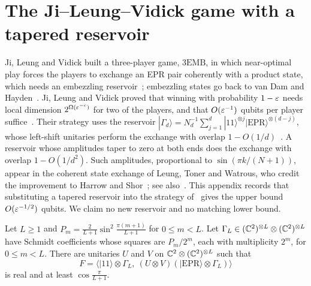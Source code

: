 \section{The Ji--Leung--Vidick game with a tapered reservoir}\label{app:reservoir}

Ji, Leung and Vidick built a three-player game, $\mathrm{3EMB}$, in which near-optimal play forces the players to exchange
an EPR pair coherently with a product state, which needs an embezzling reservoir~\cite{JLV20}; embezzling states go back to van Dam
and Hayden~\cite{vDH03}. Ji, Leung and Vidick proved that winning
with probability $1-\varepsilon$ needs local dimension $2^{\Omega(\varepsilon^{-c})}$ for two of the players, and that $O(\varepsilon^{-1})$ qubits
per player suffice~\cite[Theorem~1]{JLV20}. Their strategy uses the reservoir
$|\Gamma_d\rangle=N_d^{-1}\sum_{j=1}^d|11\rangle^{\otimes j}|\mathrm{EPR}\rangle^{\otimes(d-j)}$, whose left-shift unitaries perform
the exchange with overlap $1-O(1/d)$~\cite[(7)]{JLV20}. A reservoir whose amplitudes taper to zero at both ends does the
exchange with overlap $1-O(1/d^2)$. Such amplitudes, proportional to $\sin(\pi k/(N+1))$, appear in the coherent state
exchange of Leung, Toner and Watrous, who credit the improvement to Harrow and Shor~\cite[footnote~1]{LTW13}; see
also~\cite{LW14}. This appendix records that substituting a tapered reservoir into the strategy of~\cite[Lemma~7]{JLV20}
gives the upper bound $O(\varepsilon^{-1/2})$ qubits. We claim no new reservoir and no matching lower bound.

\begin{lemma}\label{lem:reservoir}
Let $L\ge1$ and $P_m=\frac2{L+1}\sin^2\frac{\pi(m+1)}{L+1}$ for $0\le m<L$. Let $\Gamma_L\in(\mathbb C^2)^{\otimes L}\otimes(\mathbb C^2)^{\otimes L}$
have Schmidt coefficients whose squares are $P_m/2^m$, each with multiplicity $2^m$, for $0\le m<L$. There are unitaries $U$
and $V$ on $\mathbb C^2\otimes(\mathbb C^2)^{\otimes L}$ such that
\[
F=\bigl\langle|11\rangle\otimes\Gamma_L,\ (U\otimes V)(|\mathrm{EPR}\rangle\otimes\Gamma_L)\bigr\rangle
\]
is real and at least $\cos\frac\pi{L+1}$.
\end{lemma}


